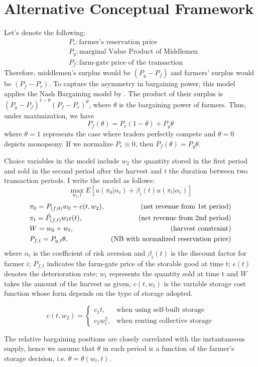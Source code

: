 \newpage
\section{Alternative Conceptual Framework}

Let's denote the following:
\begin{align*}
    & P_r: \text{farmer's reservation price} \\
    & P_y: \text{marginal Value Product of Middlemen} \\
    & P_f: \text{farm-gate price of the transaction} 
\end{align*}
Therefore, middlemen's surplus would be $(P_y-P_f)$ and farmers' surplus would be $(P_f-P_r)$. To capture the asymmetry in bargaining power, this model applies the Nash Bargaining model by \cite{binmore1986nash}. The product of their surplus is $(P_y-P_f)^{1-\theta}(P_f-P_r)^{\theta}$, where $\theta$ is the bargaining power of farmers. Thus, under maximization, we have
$$
P_f(\theta) = P_r(1-\theta) + P_y\theta
$$
where $\theta=1$ represents the case where traders perfectly compete and $\theta=0$ depicts monopsony. If we normalize $P_r\equiv 0$, then $P_f(\theta) = P_y \theta$.


Choice variables in the model include $w_2$ the quantity stored in the first period and sold in the second period after the harvest and $t$ the duration between two transaction periods. I write the model as follows:
\begin{equation}
    \max_{w_t,t} E[u(\pi_0|\alpha_i) + \beta_i(t) u(\pi_t|\alpha_i)]
\end{equation}
\begin{align*}
    & \pi_0= P_{(f,0)} w_0 - c(t,w_2), & \text {(net revenue from 1st period)}\\
    & \pi_t= \Tilde{P}_{(f,t)} w_t \epsilon(t), & \text {(net revenue from 2nd period)} \\
    & W = w_0 + w_t, & \text {(harvest constraint)}\\
    & P_{f,t} = P_{y,t}\theta, & \text {(NB with normalized reservation price)}
\end{align*}
where $\alpha_i$ is the coefficient of risk aversion and $\beta_i(t)$ is the discount factor for farmer $i$; $P_{f,t}$ indicates the farm-gate price of the storable good at time t; $\epsilon(t)$ denotes the deterioration rate; $w_t$ represents the quantity sold at time t and $W$ takes the amount of the harvest as given; $c(t,w_t)$ is the variable storage cost function whose form depends on the type of storage adopted.

\begin{equation}
c\left(t, w_2\right)=
                \begin{cases}
                c_1 t, & \text {when using self-built storage} \\ 
                c_2 w_t^2, & \text {when renting collective storage}
                \end{cases}
\end{equation}

The relative bargaining positions are closely correlated with the instantaneous supply, hence we assume that $\theta$ in each period is a function of the farmer's storage decision, i.e. $\theta=\theta(w_t,t)$. 